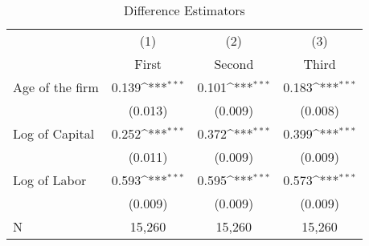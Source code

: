 \begin{table}[htbp]\centering
\def\sym#1{\ifmmode^{#1}\else\(^{#1}\)\fi}
\caption{Difference Estimators \label{tab:q3}}
\begin{tabular}{l*{3}{c}}
\toprule
                    &\multicolumn{1}{c}{(1)}&\multicolumn{1}{c}{(2)}&\multicolumn{1}{c}{(3)}\\
                    &\multicolumn{1}{c}{First}&\multicolumn{1}{c}{Second}&\multicolumn{1}{c}{Third}\\
\midrule
Age of the firm     &       0.139\sym{***}&       0.101\sym{***}&       0.183\sym{***}\\
                    &     (0.013)         &     (0.009)         &     (0.008)         \\
\addlinespace
Log of Capital      &       0.252\sym{***}&       0.372\sym{***}&       0.399\sym{***}\\
                    &     (0.011)         &     (0.009)         &     (0.009)         \\
\addlinespace
Log of Labor        &       0.593\sym{***}&       0.595\sym{***}&       0.573\sym{***}\\
                    &     (0.009)         &     (0.009)         &     (0.009)         \\
\midrule
N                   &      15,260         &      15,260         &      15,260         \\
\bottomrule
\end{tabular}
\end{table}

